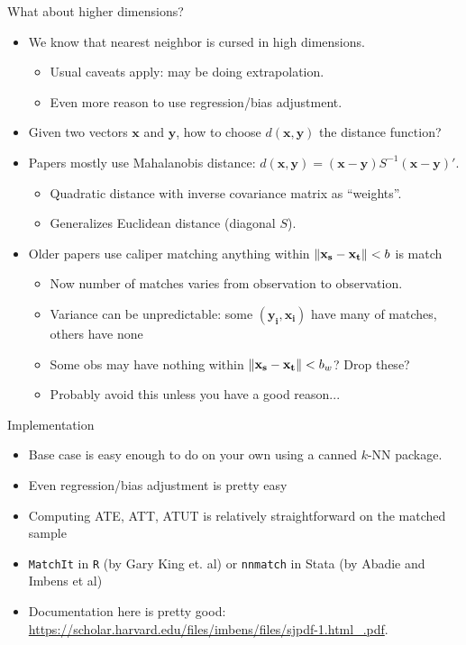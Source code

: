 \documentclass[xcolor=pdftex,dvipsnames,table,mathserif,aspectratio=169]{beamer}
\DeclarePairedDelimiter\norm{\lVert}{\rVert}%
\begin{document}
\begin{frame}{What about higher dimensions?}
\begin{itemize}
\item We know that nearest neighbor is \alert{cursed} in high dimensions.
\begin{itemize}
\item Usual caveats apply: may be doing \alert{extrapolation}.
\item Even more reason to use regression/bias adjustment.
\end{itemize}
\item Given two vectors $\mathbf{x}$ and $\mathbf{y}$, how to choose $d(\mathbf{x},\mathbf{y})$ the \alert{distance} function?
\item Papers mostly use \alert{Mahalanobis distance}: $d(\mathbf{x},\mathbf{y}) = (\mathbf{x}-\mathbf{y}) S^{-1} (\mathbf{x}-\mathbf{y})'$.
\begin{itemize}
\item Quadratic distance with inverse covariance matrix as ``weights''.
\item Generalizes Euclidean distance (diagonal $S$).
\end{itemize}
\item Older papers use \alert{caliper matching} anything within $\norm{\mathbf{x_s} -\mathbf{x_t}}<b$ is match
\begin{itemize}
\item Now number of matches varies from observation to observation.
\item Variance can be unpredictable: some $(\mathbf{y_i},\mathbf{x_i})$ have many of matches, others have none
\item Some obs may have nothing within $\norm{\mathbf{x_s} -\mathbf{x_t}}<b_w$? Drop these?
\item Probably avoid this unless you have a good reason...
\end{itemize}
\end{itemize}
\end{frame}

\begin{frame}{Implementation}
\begin{itemize}
\item Base case is easy enough to do on your own using a canned $k$-NN package.
\item Even regression/bias adjustment is pretty easy
\item Computing ATE, ATT, ATUT is relatively straightforward on the matched sample
\item \texttt{MatchIt} in \texttt{R} (by Gary King et. al)  or \texttt{nnmatch} in Stata (by Abadie and Imbens et al)
\item Documentation here is pretty good: \url{https://scholar.harvard.edu/files/imbens/files/sjpdf-1.html_.pdf}.
\end{itemize}

\end{frame}
\end{document}

